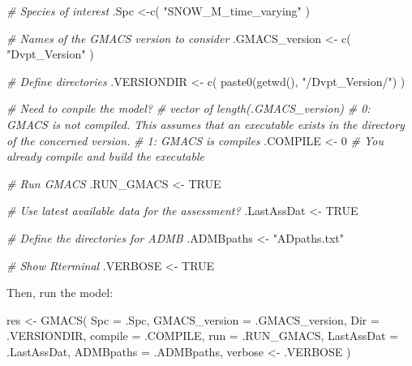 \documentclass[
]{article}
\newenvironment{Shaded}{\begin{snugshade}}{\end{snugshade}}
\newcommand{\AttributeTok}[1]{\textcolor[rgb]{0.77,0.63,0.00}{#1}}
\newcommand{\CommentTok}[1]{\textcolor[rgb]{0.56,0.35,0.01}{\textit{#1}}}
\newcommand{\ConstantTok}[1]{\textcolor[rgb]{0.00,0.00,0.00}{#1}}
\newcommand{\DecValTok}[1]{\textcolor[rgb]{0.00,0.00,0.81}{#1}}
\newcommand{\FunctionTok}[1]{\textcolor[rgb]{0.00,0.00,0.00}{#1}}
\newcommand{\NormalTok}[1]{#1}
\newcommand{\OtherTok}[1]{\textcolor[rgb]{0.56,0.35,0.01}{#1}}
\newcommand{\StringTok}[1]{\textcolor[rgb]{0.31,0.60,0.02}{#1}}
\begin{document}
\begin{Shaded}
\begin{Highlighting}[]

\CommentTok{\# Species of interest}
\NormalTok{.Spc }\OtherTok{\textless{}{-}}\FunctionTok{c}\NormalTok{(}
  \StringTok{"SNOW\_M\_time\_varying"}
\NormalTok{  )}

\CommentTok{\# Names of the GMACS version to consider}
\NormalTok{.GMACS\_version }\OtherTok{\textless{}{-}} \FunctionTok{c}\NormalTok{(}
  \StringTok{"Dvpt\_Version"}
\NormalTok{  )}

\CommentTok{\# Define directories}
\NormalTok{.VERSIONDIR }\OtherTok{\textless{}{-}} \FunctionTok{c}\NormalTok{(}
  \FunctionTok{paste0}\NormalTok{(}\FunctionTok{getwd}\NormalTok{(), }\StringTok{"/Dvpt\_Version/"}\NormalTok{)}
\NormalTok{  )}

\CommentTok{\# Need to conpile the model?}
  \CommentTok{\# vector of length(.GMACS\_version)}
  \CommentTok{\# 0: GMACS is not compiled. This assumes that an executable exists in the directory of the concerned version.}
  \CommentTok{\# 1: GMACS is compiles}
\NormalTok{.COMPILE }\OtherTok{\textless{}{-}} \DecValTok{0}       \CommentTok{\# You already compile and build the executable}

\CommentTok{\# Run GMACS}
\NormalTok{.RUN\_GMACS }\OtherTok{\textless{}{-}} \ConstantTok{TRUE}

\CommentTok{\# Use latest available data for the assessment?}
\NormalTok{.LastAssDat }\OtherTok{\textless{}{-}} \ConstantTok{TRUE}

\CommentTok{\# Define the directories for ADMB}
\NormalTok{.ADMBpaths }\OtherTok{\textless{}{-}} \StringTok{"ADpaths.txt"}

\CommentTok{\# Show Rterminal}
\NormalTok{.VERBOSE }\OtherTok{\textless{}{-}} \ConstantTok{TRUE}
\end{Highlighting}
\end{Shaded}

Then, run the model:

\begin{Shaded}
\begin{Highlighting}[]
\NormalTok{res }\OtherTok{\textless{}{-}} \FunctionTok{GMACS}\NormalTok{(}
  \AttributeTok{Spc =}\NormalTok{ .Spc,}
  \AttributeTok{GMACS\_version =}\NormalTok{ .GMACS\_version,}
  \AttributeTok{Dir =}\NormalTok{ .VERSIONDIR,}
  \AttributeTok{compile =}\NormalTok{ .COMPILE,}
  \AttributeTok{run =}\NormalTok{ .RUN\_GMACS,}
  \AttributeTok{LastAssDat =}\NormalTok{ .LastAssDat,}
  \AttributeTok{ADMBpaths =}\NormalTok{ .ADMBpaths,}
\NormalTok{  verbose }\OtherTok{\textless{}{-}}\NormalTok{ .VERBOSE}
\NormalTok{)}
\end{Highlighting}
\end{Shaded}
\end{document}
